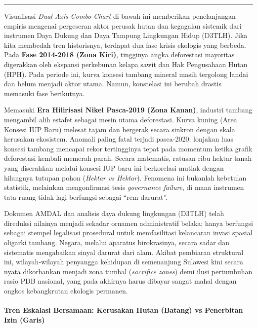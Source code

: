 \documentclass[
]{article}
\begin{document}
\begin{center}\rule{0.5\linewidth}{0.5pt}\end{center}

Visualisasi \emph{Dual-Axis Combo Chart} di bawah ini memberikan
penelanjangan empiris mengenai pergeseran aktor perusak hutan dan
kegagalan sistemik dari instrumen Daya Dukung dan Daya Tampung
Lingkungan Hidup (D3TLH). Jika kita membedah tren historisnya, terdapat
dua fase krisis ekologis yang berbeda. Pada \textbf{Fase 2014-2018 (Zona
Kiri)}, tingginya angka deforestasi mayoritas digerakkan oleh ekspansi
perkebunan kelapa sawit dan Hak Pengusahaan Hutan (HPH). Pada periode
ini, kurva konsesi tambang mineral masih tergolong landai dan belum
menjadi aktor utama. Namun, konstelasi ini berubah drastis memasuki fase
berikutnya.

Memasuki \textbf{Era Hilirisasi Nikel Pasca-2019 (Zona Kanan)}, industri
tambang mengambil alih estafet sebagai mesin utama deforestasi. Kurva
kuning (Area Konsesi IUP Baru) melesat tajam dan bergerak secara sinkron
dengan skala kerusakan ekosistem. Anomali paling fatal terjadi
pasca-2020: lonjakan luas konsesi tambang mencapai rekor tertingginya
tepat pada momentum ketika grafik deforestasi kembali memerah parah.
Secara matematis, ratusan ribu hektar tanah yang diserahkan melalui
konsesi IUP baru ini berkorelasi mutlak dengan hilangnya tutupan pohon
(\emph{Hektar vs Hektar}). Fenomena ini bukanlah kebetulan statistik,
melainkan mengonfirmasi tesis \emph{governance failure}, di mana
instrumen tata ruang tidak lagi berfungsi sebagai ``rem darurat''.

Dokumen AMDAL dan analisis daya dukung lingkungan (D3TLH) telah
direduksi nilainya menjadi sekadar ornamen administratif belaka; hanya
berfungsi sebagai stempel legalisasi prosedural untuk memfasilitasi
kelancaran invasi spasial oligarki tambang. Negara, melalui aparatus
birokrasinya, secara sadar dan sistematis mengabaikan sinyal darurat
dari alam. Akibat pembiaran struktural ini, wilayah-wilayah penyangga
kehidupan di semenanjung Sulawesi kini secara nyata dikorbankan menjadi
zona tumbal (\emph{sacrifice zones}) demi ilusi pertumbuhan rasio PDB
nasional, yang pada akhirnya harus dibayar sangat mahal dengan ongkos
kebangkrutan ekologis permanen.

\paragraph{Tren Eskalasi Bersamaan: Kerusakan Hutan (Batang) vs
Penerbitan Izin
(Garis)}\label{tren-eskalasi-bersamaan-kerusakan-hutan-batang-vs-penerbitan-izin-garis}
\end{document}
